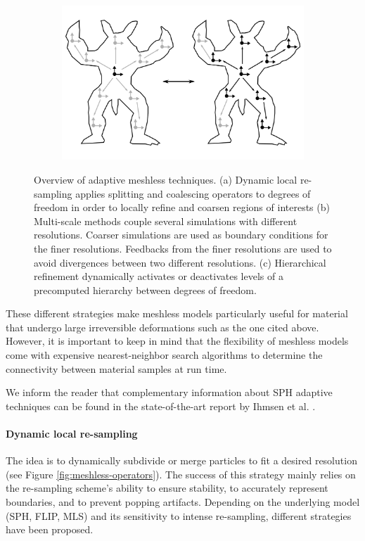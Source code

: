 \begin{figure}[t]
\begin{subfigure}[b]{0.3\linewidth}
		\includegraphics[width=\linewidth]{images/starAdaptivity-cgf2016/particles-hierarchy.png}
		\caption{\label{fig:meshless-hierarchy}}
	\end{subfigure}
	\caption[STAR adaptivity: Meshless techniques]{\label{fig:particleOverview}
		Overview of adaptive meshless techniques.
		(a) Dynamic local re-sampling applies splitting and coalescing operators to degrees of freedom in order to locally refine and coarsen regions of interests (b) Multi-scale methods couple several simulations with different resolutions. Coarser simulations are used as boundary conditions for the finer resolutions. Feedbacks from the finer resolutions are used to avoid divergences between two different resolutions. (c) Hierarchical refinement dynamically activates or deactivates levels of a precomputed hierarchy between degrees of freedom.}
\end{figure}

These different strategies make meshless models particularly useful for material that undergo large irreversible deformations such as the one cited above. However, it is important to keep in mind that the flexibility of meshless models come with expensive nearest-neighbor search algorithms to determine the connectivity between material samples at run time.

We inform the reader that complementary information about SPH adaptive techniques can be found in the state-of-the-art report by Ihmsen et al. \cite{Ihmsen2014:STAR}.

\paragraph*{Dynamic local re-sampling} The idea is to dynamically subdivide or merge particles to fit a desired resolution (see Figure \ref{fig:meshless-operators}). The success of this strategy mainly relies on the re-sampling scheme's ability to ensure stability, to accurately represent boundaries, and to prevent popping artifacts. Depending on the underlying model (SPH, FLIP, MLS) and its sensitivity to intense re-sampling, different strategies have been proposed.

